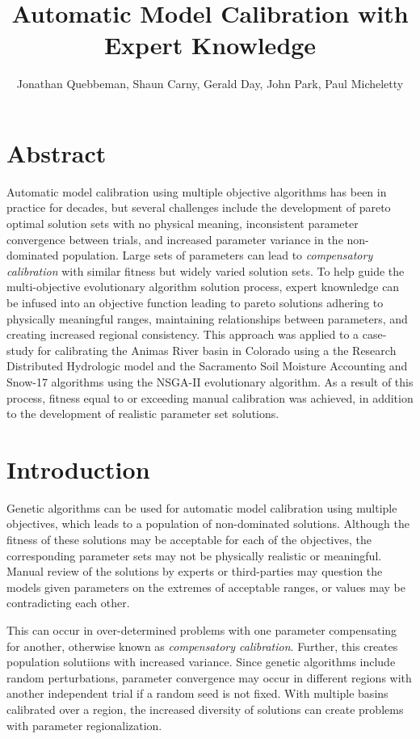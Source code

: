 \documentclass[11pt]{article} %
\title{Automatic Model Calibration with Expert Knowledge}
\author{Jonathan Quebbeman, Shaun Carny, Gerald Day, John Park, Paul Micheletty}
\begin{document}
\maketitle

\section*{Abstract}
Automatic model calibration using multiple objective algorithms has been in practice for decades, but several challenges include the development of pareto optimal solution sets with no physical meaning, inconsistent parameter convergence between trials, and increased parameter variance in the non-dominated population. Large sets of parameters can lead to \textit{compensatory calibration} with similar fitness but widely varied solution sets. To help guide the multi-objective evolutionary algorithm solution process, expert knownledge can be infused into an objective function leading to pareto solutions adhering to physically meaningful ranges, maintaining relationships between parameters, and creating increased regional consistency. This approach was applied to a case-study for calibrating the Animas River basin in Colorado using a the Research Distributed Hydrologic model and the Sacramento Soil Moisture Accounting and Snow-17 algorithms using the NSGA-II evolutionary algorithm. As a result of this process, fitness equal to or exceeding manual calibration was achieved, in addition to the development of realistic parameter set solutions.

\section{Introduction}

Genetic algorithms can be used for automatic model calibration using multiple objectives, which leads to a population of non-dominated solutions. Although the fitness of these solutions may be acceptable for each of the objectives, the corresponding parameter sets may not be physically realistic or meaningful. Manual review of the solutions by experts or third-parties may question the models given parameters on the extremes of acceptable ranges, or values may be contradicting each other. 

This can occur in over-determined problems with one parameter compensating for another, otherwise known as \textit{compensatory calibration}. Further, this creates population solutiions with increased variance. Since genetic algorithms include random perturbations, parameter convergence may occur in different regions with another independent trial if a random seed is not fixed. With multiple basins calibrated over a region, the increased diversity of solutions can create problems with parameter regionalization\cite{Steinschneider2015}.
\end{document}

